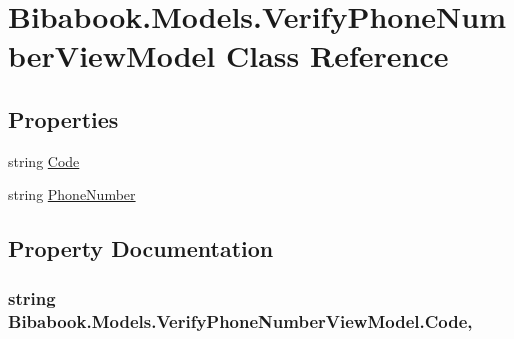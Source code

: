 \hypertarget{class_bibabook_1_1_models_1_1_verify_phone_number_view_model}{}\section{Bibabook.\+Models.\+Verify\+Phone\+Number\+View\+Model Class Reference}
\label{class_bibabook_1_1_models_1_1_verify_phone_number_view_model}
\subsection*{Properties}
\begin{DoxyCompactItemize}
\item 
string \hyperlink{class_bibabook_1_1_models_1_1_verify_phone_number_view_model_a9da6f2e18aa81f8da27dc12d45a66a28}{Code}
\item 
string \hyperlink{class_bibabook_1_1_models_1_1_verify_phone_number_view_model_a3d11e035cccb1906b12a89240ad484a1}{Phone\+Number}
\end{DoxyCompactItemize}


\subsection{Property Documentation}
\hypertarget{class_bibabook_1_1_models_1_1_verify_phone_number_view_model_a9da6f2e18aa81f8da27dc12d45a66a28}{}
\subsubsection[{Code}]{\setlength{\rightskip}{0pt plus 5cm}string Bibabook.\+Models.\+Verify\+Phone\+Number\+View\+Model.\+Code\hspace{0.3cm}{\ttfamily [get]}, {\ttfamily [set]}}\label{class_bibabook_1_1_models_1_1_verify_phone_number_view_model_a9da6f2e18aa81f8da27dc12d45a66a28}
\hypertarget{class_bibabook_1_1_models_1_1_verify_phone_number_view_model_a3d11e035cccb1906b12a89240ad484a1}{}
